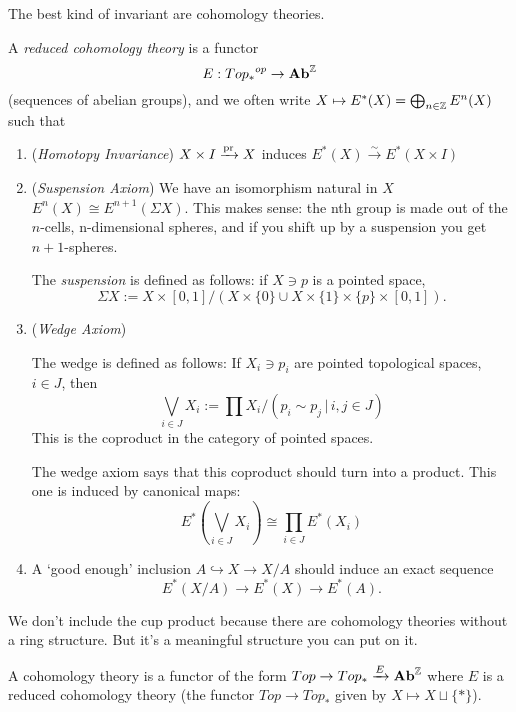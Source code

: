\documentclass[../MH_Total.tex]{subfiles}
\begin{document}
The best kind of invariant are cohomology theories.
\begin{definition}
	A \emph{reduced cohomology theory} is a functor 
	\[
	E: {Top_*}^{op} \to \mathbf{Ab}^{\mathbb{Z}}
	\]
	(sequences of abelian groups), and we often write $X \mapsto E^*(X) = \bigoplus_{n \in \mathbb{Z}} E^n(X)$ such that

	\begin{enumerate}
		\item (\emph{Homotopy Invariance}) $X \times I \xrightarrow{\operatorname{pr}} X$ induces $E^*(X) \xrightarrow{\sim} E^*(X \times I)$
		\item (\emph{Suspension Axiom}) We have an isomorphism natural in $X$ $E^n(X) \cong E^{n+1}(\Sigma X)$. This makes sense: the nth group is made out of the $n$-cells, n-dimensional spheres, and if you shift up by a suspension you get $n+1$-spheres.

		\begin{remark}
			The \emph{suspension} is defined as follows: if $X \ni p$ is a pointed space, 
			\[
			\Sigma X := X \times [0,1]/(X \times \{0\} \cup X \times \{1\} \times \{p\} \times [0,1]).
			\]
		\end{remark}

		\item (\emph{Wedge Axiom}) 

		\begin{remark}
			The wedge is defined as follows: If $X_i \ni p_i$ are pointed topological spaces, $i \in J$, then
			\[
			\bigvee_{i \in J}X_i := \prod X_i/(p_i \sim p_j \,|\, i,j \in J)
			\]
			This is the coproduct in the category of pointed spaces.
		\end{remark}

		The wedge axiom says that this coproduct should turn into a product. This one is induced by canonical maps:
		\[
		E^*(\bigvee_{i \in J} X_i )\cong \prod_{i \in J} E^*(X_i)
		\]

		\item A `good enough' inclusion $A \hookrightarrow X \to X/A$ should induce an exact sequence
		\[
		E^*(X/A) \to E^*(X) \to E^*(A).
		\]
	\end{enumerate}
\end{definition}

We don't include the cup product because there are cohomology theories without a ring structure. But it's a meaningful structure you can put on it. 

\begin{definition}
	A cohomology theory is a functor of the form $Top \to Top_* \xrightarrow{E} \mathbf{Ab}^{\mathbb{Z}}$ where $E$ is a reduced cohomology theory (the functor $Top \to Top_*$ given by $X \mapsto X \sqcup \{*\}$). 
\end{definition}
\end{document}
